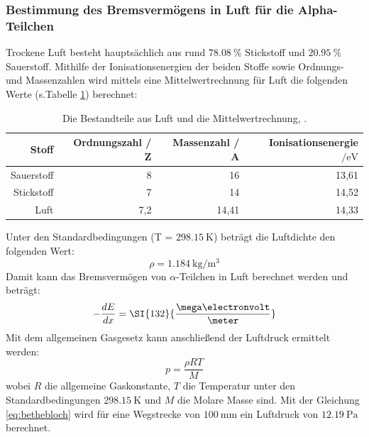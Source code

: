 \subsubsection{Bestimmung des Bremsvermögens in Luft für die Alpha-Teilchen}
Trockene Luft besteht hauptsächlich aus rund $\SI{78,08}{\percent}$ Stickstoff und $\SI{20,95}{\percent}$ Sauerstoff. Mithilfe der Ionisationsenergien der beiden Stoffe sowie Ordnungs- und Massenzahlen wird mittels eine Mittelwertrechnung für Luft die folgenden Werte 
(s.Tabelle \ref{tab:datenluft}) berechnet:

\begin{table}[htpb]
	\centering
	\caption{Die Bestandteile aus Luft und die Mittelwertrechnung, \cite{Sauerstoff} \cite{Stickstoff}.}
	\label{tab:datenluft}
	\begin{tabular}{r|r|r|r}
		\toprule
		Stoff	&	Ordnungszahl / Z &	Massenzahl / A &  Ionisationsenergie $/ \si{\electronvolt}$\\
		\hline
		Sauerstoff & 	8 & 16 & 13,61 \\
		Stickstoff &	7 & 14 & 14,52 \\
		Luft & 	7,2 & 14,41 & 14,33 \\
		\bottomrule
	\end{tabular}
\end{table}

Unter den Standardbedingungen (T = $\SI{298,15}{\kelvin}$)\cite{Luftdichte} beträgt die Luftdichte den folgenden Wert:
\begin{equation}
\rho = \SI{1,184}{\kilogram\per\cubic\meter}
\end{equation}
Damit kann das Bremsvermögen von $\alpha$-Teilchen in Luft berechnet werden und beträgt:
\begin{equation*}
-\frac{dE}{dx} = \SI{132}{\frac{\mega\electronvolt}{\meter}}
\end{equation*}
Mit dem allgemeinen Gasgesetz kann anschließend der Luftdruck ermittelt werden:
\begin{equation}
p = \frac{\rho R T}{M}
\end{equation}
wobei $R$ die allgemeine Gaskonstante, $T$ die Temperatur unter den Standardbedingungen $\SI{298,15}{\kelvin}$ und $M$ die Molare Masse sind. Mit der Gleichung \ref{eq:bethebloch} wird für eine Wegstrecke von $\SI{100}{\milli\meter}$ ein Luftdruck von $\SI{12,19}{\pascal}$ berechnet.